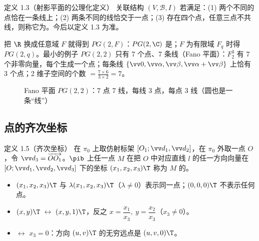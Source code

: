 \begin{defbox}{定义 1.3（射影平面的公理化定义）}
关联结构 $(V,\mathscr B,I)$ 若满足：(1) 两个不同的点恰在一条线上；(2) 两条不同的线恰交于一点；(3) 存在四个点，任意三点不共线，则称它为。今后以定义 1.3 为准。
\end{defbox}

把 $\R$ 换成任意域 $F$ 就得到 $PG(2,F)$：$PG(2,\C)$ 是；$F$ 为有限域 $F_q$ 时得 $PG(2,q)$。最小的例子 $PG(2,2)$ 只有 7 个点、7 条线（Fano 平面）：$F_2^3$ 有 7 个非零向量，每个生成一个点；每条线 $\{\vv0,\vv\alpha,\vv\beta,\vv\alpha+\vv\beta\}$ 上恰有 3 个点；2 维子空间的个数 $=\frac{7\times6}{3\times2}=7$。

\begin{figure}[htbp]
\centering
{}
\caption{Fano 平面 $PG(2,2)$：7 点 7 线，每线 3 点，每点 3 线（圆也是一条“线”）}
\end{figure}

\subsection{点的齐次坐标}

\begin{defbox}{定义 1.5（齐次坐标）}
在 $\pi_0$ 上取仿射标架 $[O_1;\vv d_1,\vv d_2]$，在 $\pi_0$ 外取一点 $O$，令 $\vv d_3=\overrightarrow{OO_1}$。$\pib$ 上任一点 $M$ 在把 $O$ 中对应直线 $l$ 的任一方向向量在 $[O;\vv d_1,\vv d_2,\vv d_3]$ 下的坐标 $(x_1,x_2,x_3)\T$ 称为 $M$ 的。
\begin{itemize}
\item $(x_1,x_2,x_3)\T$ 与 $\lambda(x_1,x_2,x_3)\T$（$\lambda\neq0$）表示同一点；$(0,0,0)\T$ 不表示任何点。
\item {} $(x,y)\T\ \leftrightarrow\ (x,y,1)\T$，反之 $x=\dfrac{x_1}{x_3},\ y=\dfrac{x_2}{x_3}$（$x_3\neq0$）。
\item {} $\leftrightarrow$ $x_3=0$：方向 $(u,v)\T$ 的无穷远点是 $(u,v,0)\T$。
\end{itemize}
\end{defbox}

